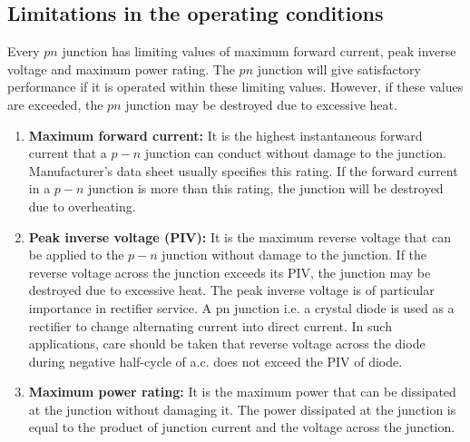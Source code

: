 \subsection{Limitations in the operating conditions}
Every $p n$ junction has limiting values of maximum forward current, peak inverse voltage and maximum power rating. The $p n$ junction will give satisfactory performance if it is operated within these limiting values. However, if these values are exceeded, the $p n$ junction may be destroyed due to excessive heat.
\begin{enumerate}
	\item \textbf{ Maximum forward current:} It is the highest instantaneous forward current that a $p-n$ junction can conduct without damage to the junction. Manufacturer's data sheet usually specifies this rating. If the forward current in a $p-n$ junction is more than this rating, the junction will be destroyed due to overheating.
	\item \textbf{Peak inverse voltage (PIV):} It is the maximum reverse voltage that can be applied to the $p-n$ junction without damage to the junction. If the reverse voltage across the junction exceeds its PIV, the junction may be destroyed due to excessive heat. The peak inverse voltage is of particular importance in rectifier service. A pn junction i.e. a crystal diode is used as a rectifier to change alternating current into direct current. In such applications, care should be taken that reverse voltage across the diode during negative half-cycle of a.c. does not exceed the PIV of diode.
	\item \textbf{Maximum power rating:} It is the maximum power that can be dissipated at the junction without damaging it. The power dissipated at the junction is equal to the product of junction current and the voltage across the junction. 
\end{enumerate}
